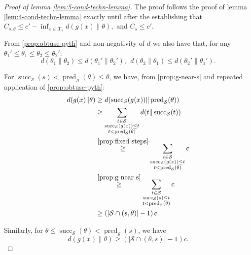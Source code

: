\documentclass{article}
\theoremstyle{definition}
\theoremstyle{definition}
\begin{document}
\begin{proof}[Proof of lemma \ref{lem:5-cond-techn-lemma}]
    The proof follows the proof of lemma \ref{lem:4-cond-techn-lemma} exactly until after the establishing that
    $
        C_{s,\theta} \leq c' - \inf_{x\in\mathcal{X}_s} d(g(x)\|\theta),
    $
    and
    $
        C_s \leq c'.
    $
    
    From \ref{prop:obtuse-pyth} and non-negativity of $d$ we also have that, for any $\theta_1' \le \theta_1 \le \theta_2 \le \theta_2'$:
    \[
        d(\theta_1\|\theta_2) \le d(\theta_1' \| \theta_2'),~~
        d(\theta_2\|\theta_1)\le d(\theta_2'\|\theta_1').
    \]

    For $\operatorname{succ}_{\mathcal{S}}(s)<\operatorname{pred}_{\mathcal{S}}(\theta)\le\theta$, we have, from \ref{prop:g-near-s} and repeated application of \ref{prop:obtuse-pyth}:
    \begin{align*}
        d(g(x)\|\theta) &\ge d(\operatorname{succ}_{\mathcal{S}}(g(x))\|\operatorname{pred}_{\mathcal{S}}(\theta))
        \\
        &\ge\sum_{\substack{
                t\in \mathcal{S}\\
                \operatorname{succ}_{
                \mathcal{S}}(g(x))\le t\\ t < \operatorname{pred}_{\mathcal{S}}(\theta)
                }} 
        d(t\|\operatorname{succ}_{\mathcal{S}}(t))
        \\
        &\overset{\ref{prop:fixed-steps}}{\ge} \sum_{\substack{
                t\in \mathcal{S}\\
                \operatorname{succ}_{
                \mathcal{S}}(g(x))\le t\\ t < \operatorname{pred}_{\mathcal{S}}(\theta)
                }} c
        \\
        &\overset{\ref{prop:g-near-s}}{\ge} \sum_{\substack{
                t\in \mathcal{S}\\
                \operatorname{succ}_{
                \mathcal{S}}(s)\le t\\ t < \operatorname{pred}_{\mathcal{S}}(\theta)
                }} c
        \\
        &\ge \left(|\mathcal{S}\cap (s,\theta)|-1\right)c.
    \end{align*}

    Similarly, for $\theta \le \operatorname{succ}_{\mathcal{S}}(\theta)<\operatorname{pred}_{\mathcal{S}}(s)$, we have
    \[
        d(g(x)\|\theta) \ge (|\mathcal{S}\cap (\theta, s)|-1)c.
    \]


\end{proof}
\end{document}
